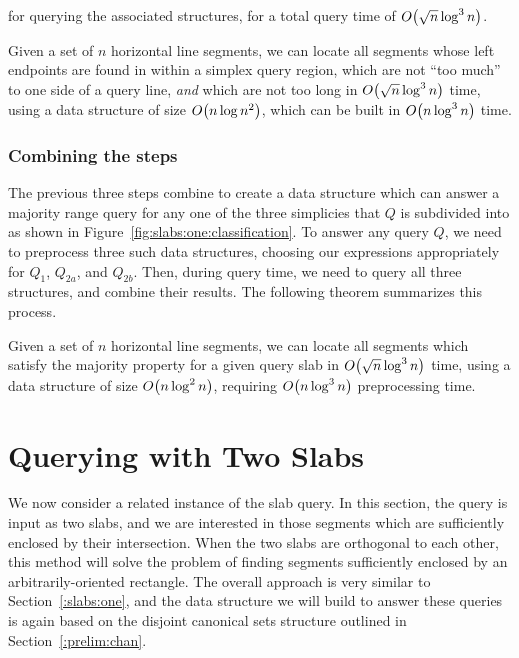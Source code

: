 \noindent
for querying the associated structures, for a total query time of $O\!\left(\sqrt{n} \log^3{n}\right)$. 

\begin{lemma}
\label{lem:slabs:one:step3}
Given a set of $n$ horizontal line segments, we can locate all segments whose left endpoints are found in within a simplex query region, which are not ``too much'' to one side of a query line, \emph{and} which are not too long in $O\!\left(\sqrt{n}\log^3{n}\right)$ time, using a data structure of size $O\!\left(n\log{n}^2\right)$, which can be built in $O\!\left(n\log^3{n}\right)$ time.
\end{lemma}

\subsubsection{Combining the steps}

The previous three steps combine to create a data structure which can answer a majority range query for any one of the three simplicies that $Q$ is subdivided into as shown in Figure~\ref{fig:slabs:one:classification}.  To answer any query $Q$, we need to preprocess three such data structures, choosing our expressions appropriately for $Q_1$, $Q_{2a}$, and $Q_{2b}$.  Then, during query time, we need to query all three structures, and combine their results. The following theorem summarizes this process.

\begin{theorem}
\label{thm:slabs:one}
Given a set of $n$ horizontal line segments, we can locate all segments which satisfy the majority property for a given query slab in $O\!\left(\sqrt{n}\log^3{n}\right)$ time, using a data structure of size $O\!\left(n\log^2{n}\right)$, requiring $O\!\left(n\log^3{n}\right)$ preprocessing time.
\end{theorem}


\section{Querying with Two Slabs}
\label{:slabs:two}

We now consider a related instance of the slab query. In this section, the query is input as two slabs, and we are interested in those segments which are sufficiently enclosed by their intersection. When the two slabs are orthogonal to each other, this method will solve the problem of finding segments sufficiently enclosed by an arbitrarily-oriented rectangle.  The overall approach is very similar to Section~\ref{:slabs:one}, and the data structure we will build to answer these queries is again based on the disjoint canonical sets structure outlined in Section~\ref{:prelim:chan}.


